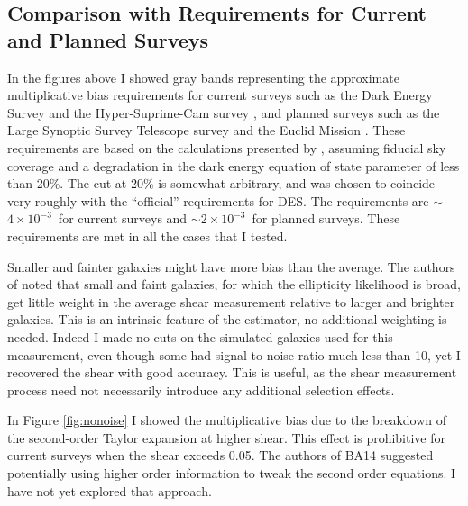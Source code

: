 \documentclass[usegraphicx,usenatbib]{mn2e}
\newcommand{\desreq}{$4\times 10^{-3}$}
\newcommand{\lsstreq}{$2\times 10^{-3}$}
\begin{document}
\subsection{Comparison with Requirements for Current and Planned Surveys}
\label{sec:req}

In the figures above I showed gray bands representing the approximate
multiplicative bias requirements for current surveys such as the Dark Energy
Survey \citep[][DES]{DESWhitePaper} and the Hyper-Suprime-Cam survey
\citep[][HSC]{HSC12}, and planned surveys such as the Large Synoptic Survey
Telescope survey \citep[][LSST]{IvezicLSST08} and the Euclid Mission
\citep{Euclid2011}.  These requirements are based on the calculations presented
by \citet{HutererSystematics06}, assuming fiducial sky coverage and a
degradation in the dark energy equation of state parameter of less than 20\%.
The cut at 20\% is somewhat arbitrary, and was chosen to coincide very roughly
with the ``official'' requirements for DES. The requirements are $\sim$\desreq\
for current surveys and $\sim$\lsstreq\ for planned surveys.  These
requirements are met in all the cases that I tested.

Smaller and fainter galaxies might have more bias than the average.  The
authors of \cite{ba14} noted that small and faint galaxies, for which the
ellipticity likelihood is broad, get little weight in the average shear
measurement relative to larger and brighter galaxies.  This is an intrinsic
feature of the estimator, no additional weighting is needed.  Indeed I made no
cuts on the simulated galaxies used for this measurement, even though some had
signal-to-noise ratio much less than 10, yet I recovered the shear with good
accuracy.  This is useful, as the shear measurement process need not
necessarily introduce any additional selection effects.

In Figure \ref{fig:nonoise} I showed the multiplicative bias due to the
breakdown of the second-order Taylor expansion at higher shear.   This effect
is prohibitive for current surveys when the shear exceeds 0.05.  The authors of
BA14 suggested potentially using higher order information to tweak the second
order equations.  I have not yet explored that approach.

\end{document}
